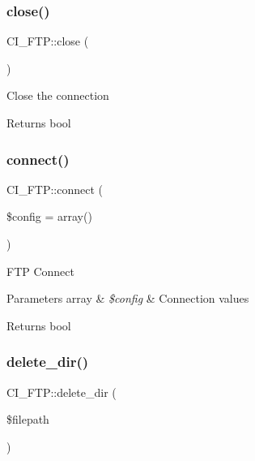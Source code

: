 \subsubsection{\texorpdfstring{close()}{close()}}
{\footnotesize\ttfamily C\+I\+\_\+\+F\+T\+P\+::close (\begin{DoxyParamCaption}{ }\end{DoxyParamCaption})}

Close the connection

\begin{DoxyReturn}{Returns}
bool 
\end{DoxyReturn}
\mbox{\label{class_c_i___f_t_p_afb016059625c88c4b7c4062f1193529d}} 
\subsubsection{\texorpdfstring{connect()}{connect()}}
{\footnotesize\ttfamily C\+I\+\_\+\+F\+T\+P\+::connect (\begin{DoxyParamCaption}\item[{}]{\$config = {\ttfamily array()} }\end{DoxyParamCaption})}

F\+TP Connect


\begin{DoxyParams}[1]{Parameters}
array & {\em \$config} & Connection values \\
\hline
\end{DoxyParams}
\begin{DoxyReturn}{Returns}
bool 
\end{DoxyReturn}
\mbox{\label{class_c_i___f_t_p_ab262d3aa6ee1d2247d494b6fd26c4788}} 
\subsubsection{\texorpdfstring{delete\+\_\+dir()}{delete\_dir()}}
{\footnotesize\ttfamily C\+I\+\_\+\+F\+T\+P\+::delete\+\_\+dir (\begin{DoxyParamCaption}\item[{}]{\$filepath }\end{DoxyParamCaption})}

